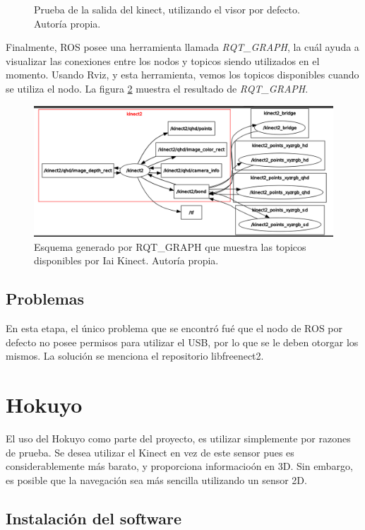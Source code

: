\begin{figure}[H]
\caption{Prueba de la salida del kinect, utilizando el visor por defecto. Autoría propia.}
\label{F:kinect1}
\end{figure}

Finalmente, ROS posee una herramienta llamada \textit{RQT\_GRAPH}, la cuál ayuda a visualizar las conexiones entre los nodos y topicos siendo utilizados en el momento. Usando Rviz, y esta herramienta, vemos los topicos disponibles cuando se utiliza el nodo. La figura \ref{F:diagramakinect} muestra el resultado de \textit{RQT\_GRAPH}.

\begin{figure}[h!]
\centering
\includegraphics[scale=0.4]{imagenes/kinect_rqt_graph.png}
\caption{Esquema generado por RQT\_GRAPH que muestra las topicos disponibles por Iai Kinect. Autoría propia.}
\label{F:diagramakinect}
\end{figure}

\subsection{Problemas}

En esta etapa, el único problema que se encontró fué que el nodo de ROS por defecto no posee permisos para utilizar el USB, por lo que se le deben otorgar los mismos. La solución se menciona el repositorio libfreenect2.

\section{Hokuyo}

El uso del Hokuyo como parte del proyecto, es utilizar simplemente por razones de prueba. Se desea utilizar el Kinect en vez de este sensor pues es considerablemente más barato, y proporciona informacioón en 3D. Sin embargo, es posible que la navegación sea más sencilla utilizando un sensor 2D.

\subsection{Instalación del software}

